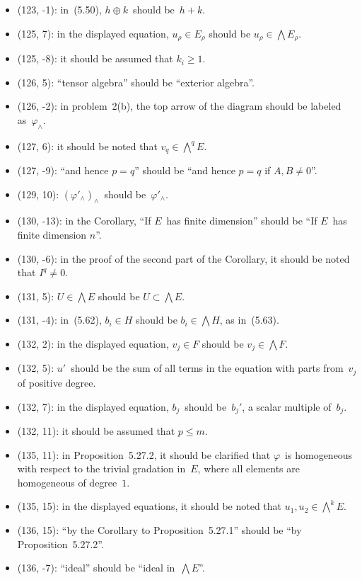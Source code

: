 \documentclass[letterpaper,12pt]{article}
\newcommand{\dsum}{\oplus}
\newcommand{\eprod}{\wedge}
\newcommand{\bigeprod}{\bigwedge}
\begin{document}
\begin{itemize}
\item (123, -1): in~(5.50), \(h\dsum k\)~should be~\(h+k\).
\item (125, 7): in the displayed equation, \(u_{\rho}\in E_{\rho}\) should be \(u_{\rho}\in\bigeprod E_{\rho}\).
\item (125, -8): it should be assumed that \(k_i\ge 1\).
\item (126, 5): ``tensor algebra'' should be ``exterior algebra''.
\item (126, -2): in problem~2(b), the top arrow of the diagram should be labeled as~\(\varphi_{\eprod}\).
\item (127, 6): it should be noted that \(v_q\in\bigeprod^q E\).
\item (127, -9): ``and hence \(p=q\)'' should be ``and hence \(p=q\) if \(A,B\ne 0\)''.
\item (129, 10): \((\varphi'_{\eprod})_{\eprod}\)~should be~\(\varphi'_{\eprod}\).
\item (130, -13): in the Corollary, ``If \(E\)~has finite dimension'' should be ``If \(E\)~has finite dimension \(n\)''.
\item (130, -6): in the proof of the second part of the Corollary, it should be noted that \(I^q\ne 0\).
\item (131, 5): \(U\in\bigeprod E\) should be \(U\subset\bigeprod E\).
\item (131, -4): in~(5.62), \(b_i\in H\) should be \(b_i\in\bigeprod H\), as in~(5.63).
\item (132, 2): in the displayed equation, \(v_j\in F\) should be \(v_j\in\bigeprod F\).
\item (132, 5): \(u'\)~should be the sum of all terms in the equation with parts from~\(v_j\) of positive degree.
\item (132, 7): in the displayed equation, \(b_j\)~should be~\(b_j'\), a scalar multiple of~\(b_j\).
\item (132, 11): it should be assumed that \(p\le m\).
\item (135, 11): in Proposition~5.27.2, it should be clarified that \(\varphi\)~is homogeneous with respect to the trivial gradation in~\(E\), where all elements are homogeneous of degree~\(1\).
\item (135, 15): in the displayed equations, it should be noted that \(u_1,u_2\in\bigeprod^k E\).
\item (136, 15): ``by the Corollary to Proposition~5.27.1'' should be ``by Proposition~5.27.2''.
\item (136, -7): ``ideal'' should be ``ideal in~\(\bigeprod E\)''.

\end{itemize}
\end{document}
